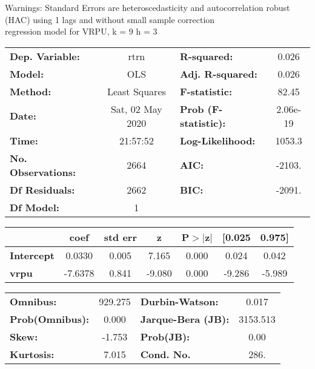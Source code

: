 Warnings: \newline
 [1] Standard Errors are heteroscedasticity and autocorrelation robust (HAC) using 1 lags and without small sample correction\\ 

regression model for VRPU, k = 9 h = 3\begin{center}
\begin{tabular}{lclc}
\toprule
\textbf{Dep. Variable:}    &       rtrn       & \textbf{  R-squared:         } &     0.026   \\
\textbf{Model:}            &       OLS        & \textbf{  Adj. R-squared:    } &     0.026   \\
\textbf{Method:}           &  Least Squares   & \textbf{  F-statistic:       } &     82.45   \\
\textbf{Date:}             & Sat, 02 May 2020 & \textbf{  Prob (F-statistic):} &  2.06e-19   \\
\textbf{Time:}             &     21:57:52     & \textbf{  Log-Likelihood:    } &    1053.3   \\
\textbf{No. Observations:} &        2664      & \textbf{  AIC:               } &    -2103.   \\
\textbf{Df Residuals:}     &        2662      & \textbf{  BIC:               } &    -2091.   \\
\textbf{Df Model:}         &           1      & \textbf{                     } &             \\
\bottomrule
\end{tabular}
\begin{tabular}{lcccccc}
                   & \textbf{coef} & \textbf{std err} & \textbf{z} & \textbf{P$> |$z$|$} & \textbf{[0.025} & \textbf{0.975]}  \\
\midrule
\textbf{Intercept} &       0.0330  &        0.005     &     7.165  &         0.000        &        0.024    &        0.042     \\
\textbf{vrpu}      &      -7.6378  &        0.841     &    -9.080  &         0.000        &       -9.286    &       -5.989     \\
\bottomrule
\end{tabular}
\begin{tabular}{lclc}
\textbf{Omnibus:}       & 929.275 & \textbf{  Durbin-Watson:     } &    0.017  \\
\textbf{Prob(Omnibus):} &   0.000 & \textbf{  Jarque-Bera (JB):  } & 3153.513  \\
\textbf{Skew:}          &  -1.753 & \textbf{  Prob(JB):          } &     0.00  \\
\textbf{Kurtosis:}      &   7.015 & \textbf{  Cond. No.          } &     286.  \\
\bottomrule
\end{tabular}
\end{center}

